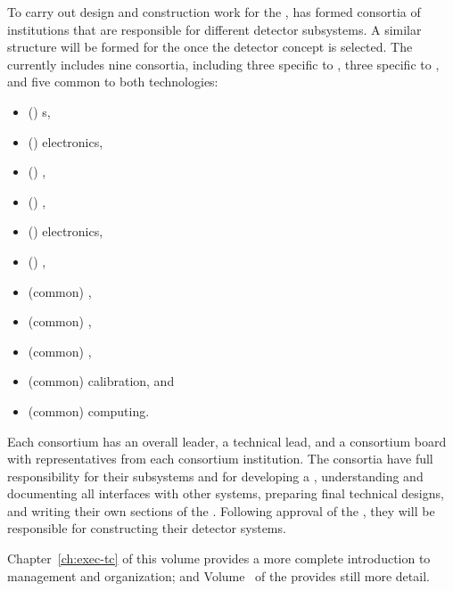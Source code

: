To carry out design and construction work for the  ,  has  formed consortia of institutions that are responsible for different detector subsystems. A similar structure will be formed for the   once the detector concept is selected. The   currently includes nine consortia, including three specific to , three specific to , and five common to both technologies:
\begin{itemize}
\item (\single) s, %
\item (\single)  electronics, %
\item (\single) , %
\item (\dual) , %
\item (\dual)  electronics, %
\item (\dual) , %
\item (common) , %
\item (common) ,  %
\item (common) , %
\item (common) calibration,  and %
\item (common) computing.
\end{itemize} 
 Each consortium has an overall leader, a technical lead, and a consortium board with representatives from each consortium institution. The consortia have full responsibility for their subsystems and for developing a , understanding and documenting all interfaces with other systems, preparing final technical designs, and writing their own sections of the . Following approval of the  , they will be responsible for constructing their detector systems. %

Chapter~\ref{ch:exec-tc} of this volume provides a more complete introduction to  management and organization; and Volume~\volnumbertc{} of the  provides still more detail.

